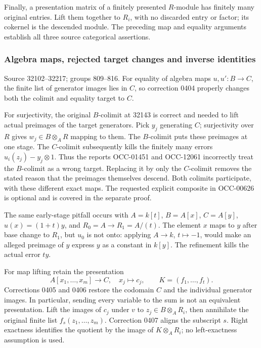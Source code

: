 Finally, a presentation matrix of a finitely presented \(R\)-module has finitely many original entries. Lift them together to \(R_i\), with no discarded entry or factor; its cokernel is the descended module. The preceding map and equality arguments establish all three source categorical assertions.

\subsubsection{Algebra maps, rejected target changes and inverse identities}\label{algebra-maps-rejected-target-changes-and-inverse-identities}

Source 32102--32217; groups 809--816. For equality of algebra maps \(u,u':B\to C\), the finite list of generator images lies in \(C\), so correction 0404 properly changes both the colimit and equality target to \(C\).

For surjectivity, the original \(B\)-colimit at 32143 is correct and needed to lift actual preimages of the target generators. Pick \(y_j\) generating \(C\); surjectivity over \(R\) gives \(w_j\in B\otimes_A R\) mapping to them. The \(B\)-colimit puts these preimages at one stage. The \(C\)-colimit subsequently kills the finitely many errors \(u_i(z_j)-y_j\otimes1\). Thus the reports OCC-01451 and OCC-12061 incorrectly treat the \(B\)-colimit as a wrong target. Replacing it by only the \(C\)-colimit removes the stated reason that the preimages themselves descend. Both colimits participate, with these different exact maps. The requested explicit composite in OCC-00626 is optional and is covered in the separate proof.

The same early-stage pitfall occurs with \(A=k[t]\), \(B=A[x]\), \(C=A[y]\), \(u(x)=(1+t)y\), and \(R_0=A\to R_1=A/(t)\). The element \(x\) maps to \(y\) after base change to \(R_1\), but \(u_0\) is not onto: applying \(A\to k\), \(t\mapsto-1\), would make an alleged preimage of \(y\) express \(y\) as a constant in \(k[y]\). The refinement kills the actual error \(ty\).

For map lifting retain the presentation \[
A[x_1,\ldots,x_m]\longrightarrow C,\quad x_j\longmapsto c_j,
\qquad K=(f_1,\ldots,f_t).
\] Corrections 0405 and 0406 restore the codomain \(C\) and the individual generator images. In particular, sending every variable to the sum is not an equivalent presentation. Lift the images of \(c_j\) under \(v\) to \(z_j\in B\otimes_A R_i\), then annihilate the original finite list \(f_s(z_1,\ldots,z_m)\). Correction 0407 aligns the subscript \(s\). Right exactness identifies the quotient by the image of \(K\otimes_A R_i\); no left-exactness assumption is used.

